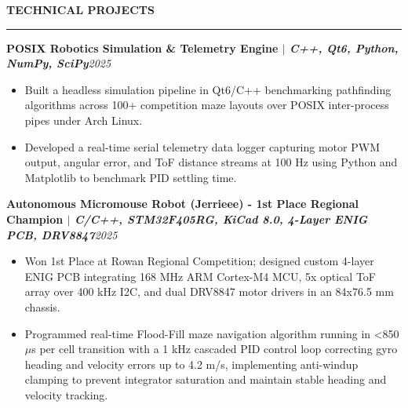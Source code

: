 \documentclass[10pt]{article}
\newcommand{\Section}[1]{%
  \vspace{4.0pt}%
  \textbf{\MakeUppercase{#1}}\par\vspace{-3.5pt}%
  \rule{\linewidth}{0.55pt}\par\vspace{2.5pt}%
}
\newcommand{\ProjectHeading}[2]{\noindent\textbf{#1}\hfill\textit{#2}\par}
\begin{document}
\vspace{2pt}
\Section{Technical Projects}
\ProjectHeading{POSIX Robotics Simulation \& Telemetry Engine $|$ \emph{C++, Qt6, Python, NumPy, SciPy}}{2025}
\begin{itemize}
  \item Built a headless simulation pipeline in Qt6/C++ benchmarking pathfinding algorithms across 100+ competition maze layouts over POSIX inter-process pipes under Arch Linux.
  \item Developed a real-time serial telemetry data logger capturing motor PWM output, angular error, and ToF distance streams at 100 Hz using Python and Matplotlib to benchmark PID settling time.
\end{itemize}
\vspace{2pt}
\ProjectHeading{Autonomous Micromouse Robot (Jerrieee) - 1st Place Regional Champion $|$ \emph{C/C++, STM32F405RG, KiCad 8.0, 4-Layer ENIG PCB, DRV8847}}{2025}
\begin{itemize}
  \item Won 1st Place at Rowan Regional Competition; designed custom 4-layer ENIG PCB integrating 168 MHz ARM Cortex-M4 MCU, 5x optical ToF array over 400 kHz I2C, and dual DRV8847 motor drivers in an 84x76.5 mm chassis.
  \item Programmed real-time Flood-Fill maze navigation algorithm running in <850 $\mu$s per cell transition with a 1 kHz cascaded PID control loop correcting gyro heading and velocity errors up to 4.2 m/s, implementing anti-windup clamping to prevent integrator saturation and maintain stable heading and velocity tracking.
\end{itemize}
\vspace{2pt}
\end{document}
